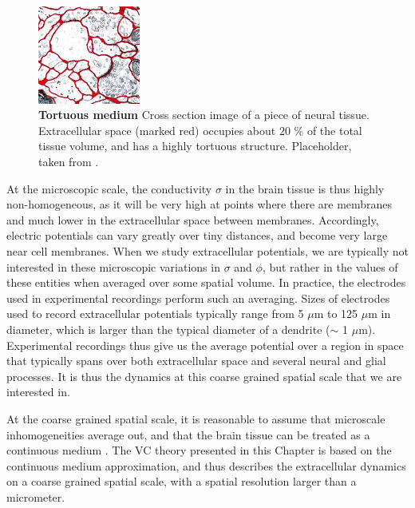 \begin{figure}[!ht]
\begin{center}
\includegraphics[width=0.3\textwidth]{Figures/VC/ECSdummy.jpeg}
\end{center}
\caption{\textbf{Tortuous medium}  Cross section image of a piece of neural tissue. Extracellular space (marked red) occupies about 20 \% of the total tissue volume, and has a highly tortuous structure. Placeholder, taken from \cite{Sykova2008}.
}
\label{VC:fig:ECS}
\end{figure}

At the microscopic scale, the conductivity $\sigma$ in the brain tissue is thus highly non-homogeneous, as it will be very high at points where there are membranes and much lower in the extracellular space between membranes. Accordingly, electric potentials can vary greatly over tiny distances, and become very large near cell membranes. When we study extracellular potentials, we are typically not interested in these microscopic variations in $\sigma$ and $\phi$, but rather in the values of these entities when averaged over some spatial volume. In practice, the electrodes used in experimental recordings perform such an averaging. Sizes of electrodes used to record extracellular potentials typically range from 5 $\mu$m to 125 $\mu$m in diameter\cite{Viswam2019}, which is larger than the typical diameter of a dendrite ($\sim$ 1 $\mu$m). Experimental recordings thus give us the average potential over a region in space that typically spans over both extracellular space and several neural and glial processes. It is thus the dynamics at this coarse grained spatial scale that we are interested in. 

At the coarse grained spatial scale, it is reasonable to assume that microscale inhomogeneities average out, and that the brain tissue can be treated as a continuous medium \cite{Gratiy2017}. The VC theory presented in this Chapter is based on the continuous medium approximation, and thus describes the extracellular dynamics on a coarse grained spatial scale, with a spatial resolution larger than a micrometer. 

